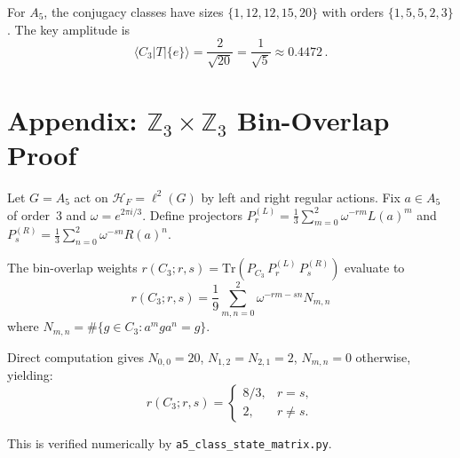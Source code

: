 \documentclass[11pt,a4paper]{article}
\newcommand{\Tr}{\mathrm{Tr}}
\begin{document}
For $A_5$, the conjugacy classes have sizes $\{1,12,12,15,20\}$ with
orders $\{1,5,5,2,3\}$.  The key amplitude is
\[
\langle C_3|T|\{e\}\rangle = \frac{2}{\sqrt{20}} = \frac{1}{\sqrt{5}} \approx 0.4472\,.
\]

\section{Appendix: $\mathbb{Z}_3\times\mathbb{Z}_3$ Bin-Overlap Proof}
\label{app:bin}

Let $G=A_5$ act on $\mathcal{H}_F = \ell^2(G)$ by left and right regular actions.
Fix $a\in A_5$ of order~3 and $\omega = e^{2\pi i/3}$.  Define projectors
$P_r^{(L)} = \frac{1}{3}\sum_{m=0}^{2}\omega^{-rm}L(a)^m$ and
$P_s^{(R)} = \frac{1}{3}\sum_{n=0}^{2}\omega^{-sn}R(a)^n$.

The bin-overlap weights $r(C_3;r,s) = \Tr(P_{C_3}\,P_r^{(L)}\,P_s^{(R)})$
evaluate to
\[
r(C_3;r,s) = \frac{1}{9}\sum_{m,n=0}^{2}\omega^{-rm-sn}N_{m,n}
\]
where $N_{m,n} = \#\{g\in C_3 : a^m g a^n = g\}$.

Direct computation gives $N_{0,0}=20$, $N_{1,2}=N_{2,1}=2$, $N_{m,n}=0$
otherwise, yielding:
\[
r(C_3;r,s) = \begin{cases} 8/3, & r=s,\\ 2, & r\neq s. \end{cases}
\]

This is verified numerically by \texttt{a5\_class\_state\_matrix.py}.
\end{document}
